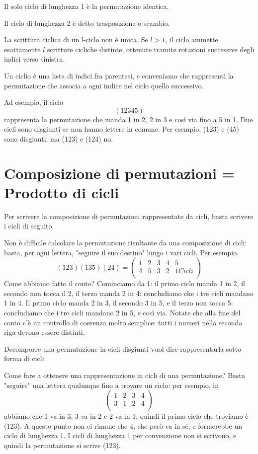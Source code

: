 Il solo ciclo di lunghezza 1 è la permutazione identica.

Il ciclo di lunghezza 2 è detto trasposizione o scambio.

La scrittura ciclica di un l-ciclo non è unica. Se $l>1$, il ciclo ammette esattamente $l$ scritture cicliche distinte,
ottenute tramite rotazioni successive degli indici verso sinistra.

Un ciclio è una lista di indici fra parentesi, e conveniamo che rappresenti la permutazione che associa a ogni indice nel ciclo
quello successivo.

\medskip
Ad esempio, il ciclo
\[
(12345)
\]
rappresenta la permutazione che manda 1 in 2, 2 in 3 e così via fino a 5 in 1. Due cicli sono disgiunti se non hanno lettere in comune.
Per esempio, (123) e (45) sono disgiunti, ma (123) e (124) no. 

\section{Composizione di permutazioni = Prodotto di cicli}
Per scrivere la composizione di permutazioni rappresentate da cicli,
basta scrivere i cicli di seguito.

Non è difficile calcolare la permutazione risultante da una composizione di cicli: basta, per ogni lettera, "seguire il suo destino" lungo
i vari cicli. Per esempio,
\[
(123)(135)(24) = \left(\begin{array}{ccccc}
1 & 2 & 3 & 4 & 5 \\
4 & 5 & 3 & 2 & 1 Cicli\\
\end{array} \right)
\]
Come abbiamo fatto il conto? Cominciamo da 1: il primo ciclo manda 1 in 2, il secondo non tocca il 2, il terzo manda 2 in 4: concludiamo
che i tre cicli mandano 1 in 4. Il primo ciclo manda 2 in 3, il secondo 3 in 5, e il terzo non tocca 5: concludiamo che i tre cicli
mandano 2 in 5, e così via. Notate che alla fine del conto c'è un controllo di coerenza molto semplice:  tutti i numeri
nella seconda riga devono essere distinti.

\begin{definizione}
	Decomporre una permutazione in cicli disgiunti vuol dire rappresentarla sotto forma di cicli.
\end{definizione}

Come fare a ottenere una rappresentazione in cicli di una permutazione? Basta "seguire" una lettera qualunque fino a trovare
un ciclo: per esempio, in 
\[
\left( \begin{array}{cccc} 1 & 2 & 3 & 4 \\ 3 & 1 & 2 & 4 \\ \end{array} \right) 
\]
abbiamo che 1 va in 3, 3 va in 2 e 2 va in 1; quindi il primo ciclo che troviamo è (123). A questo punto non ci rimane che 4,
che però va in sé, e formerebbe un ciclo di lunghezza 1. I cicli di lunghezza 1 per convenzione non si scrivono, e
quindi la permutazione si scrive (123).


